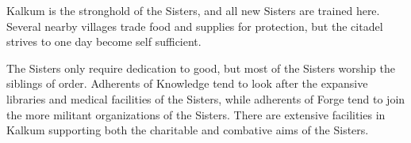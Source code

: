 Kalkum is the stronghold of the Sisters, and all new Sisters are trained here.
Several nearby villages trade food and supplies for protection, but the citadel strives to one day become self sufficient.

The Sisters only require dedication to good, but most of the Sisters worship the siblings of order.
Adherents of Knowledge tend to look after the expansive libraries and medical facilities of the Sisters, while adherents of Forge tend to join the more militant organizations of the Sisters.
There are extensive facilities in Kalkum supporting both the charitable and combative aims of the Sisters.
